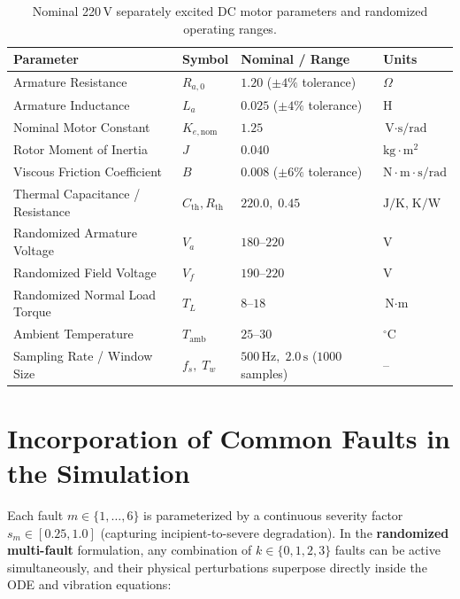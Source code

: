 \documentclass[11pt,a4paper]{article}
\begin{document}
\begin{table}[H]
\centering
\caption{Nominal 220\,V separately excited DC motor parameters and randomized operating ranges.}
\label{tab:nominal_params}
\begin{tabular}{@{}llll@{}}
\toprule
\textbf{Parameter} & \textbf{Symbol} & \textbf{Nominal / Range} & \textbf{Units} \\
\midrule
Armature Resistance & $R_{a,0}$ & $1.20$ ($\pm 4\%$ tolerance) & $\Omega$ \\
Armature Inductance & $L_a$ & $0.025$ ($\pm 4\%$ tolerance) & H \\
Nominal Motor Constant & $K_{e,\text{nom}}$ & $1.25$ & $\text{V}\cdot\text{s/rad}$ \\
Rotor Moment of Inertia & $J$ & $0.040$ & $\text{kg}\cdot\text{m}^2$ \\
Viscous Friction Coefficient & $B$ & $0.008$ ($\pm 6\%$ tolerance) & $\text{N}\cdot\text{m}\cdot\text{s/rad}$ \\
Thermal Capacitance / Resistance & $C_{\text{th}}, R_{\text{th}}$ & $220.0,\; 0.45$ & $\text{J/K},\; \text{K/W}$ \\
Randomized Armature Voltage & $V_a$ & $180\text{--}220$ & V \\
Randomized Field Voltage & $V_f$ & $190\text{--}220$ & V \\
Randomized Normal Load Torque & $T_L$ & $8\text{--}18$ & $\text{N}\cdot\text{m}$ \\
Ambient Temperature & $T_{\text{amb}}$ & $25\text{--}30$ & $^\circ\text{C}$ \\
Sampling Rate / Window Size & $f_s,\; T_w$ & $500\,\text{Hz},\; 2.0\,\text{s}$ ($1000$ samples) & -- \\
\bottomrule
\end{tabular}
\end{table}

\section{Incorporation of Common Faults in the Simulation}

Each fault $m \in \{1,\dots,6\}$ is parameterized by a continuous severity factor $s_m \in [0.25, 1.0]$ (capturing incipient-to-severe degradation). In the \textbf{randomized multi-fault} formulation, any combination of $k \in \{0, 1, 2, 3\}$ faults can be active simultaneously, and their physical perturbations superpose directly inside the ODE and vibration equations:
\end{document}
